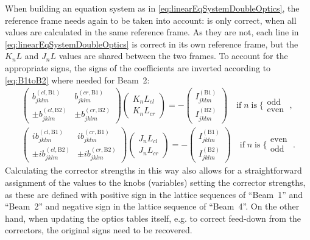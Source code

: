 When building an equation system as in \cref{eq:linearEqSystemDoubleOptics}, the reference frame needs again to be taken into account:
 is only correct, when all values are calculated in the same reference frame.  
As they are not, each line in \cref{eq:linearEqSystemDoubleOptics} is correct in its own reference frame, 
but the $K_nL$ and $J_nL$ values are shared between the two frames. 
To account for the appropriate signs, the signs of the coefficients are inverted according to \cref{eq:B1toB2} where needed for Beam~2: 
%
\begin{equation}    
    \label{eq:linearEqSystemDoubleOpticsBeamDirection}
    \begin{split}
        \begin{pmatrix}
            b_{jklm}^{(cl, \text{B1})} & b_{jklm}^{(cr, \text{B1})} \\
            \pm b_{jklm}^{(cl, \text{B2})} & \pm b_{jklm}^{(cr, \text{B2})}
        \end{pmatrix}
        \begin{pmatrix}
            K_{n}L_{cl} \\ 
            K_{n}L_{cr}
        \end{pmatrix}
        = -
        \begin{pmatrix}
            I^{(\text{B1})}_{jklm} \\ 
            I^{(\text{B2})}_{jklm} 
        \end{pmatrix} 
        \quad \text{if} \; n \; \text{is} \; \{\substack{\text{odd}\\\text{even}} \;,
        \\ 
        \begin{pmatrix}
            ib_{jklm}^{(cl, \text{B1})} & ib_{jklm}^{(cr, \text{B1})} \\
            \pm ib_{jklm}^{(cl, \text{B2})} & \pm ib_{jklm}^{(cr, \text{B2})}
        \end{pmatrix}
        \begin{pmatrix}
            J_{n}L_{cl} \\ 
            J_{n}L_{cr}
        \end{pmatrix}
        = -
        \begin{pmatrix}
            I^{(\text{B1})}_{jklm} \\ 
            I^{(\text{B2})}_{jklm} 
        \end{pmatrix} 
        \quad \text{if} \; n \; \text{is} \; \{\substack{\text{even}\\\text{odd}} \;.
    \end{split}
\end{equation}
%
Calculating the corrector strengths in this way also allows for a 
straightforward assignment of the values to the  knobs (variables) setting the corrector strengths, 
as these are defined with positive sign in the lattice sequences of ``Beam~1'' and ``Beam~2''
and negative sign in the lattice sequence of ``Beam~4''.
On the other hand, when updating the optics tables itself, e.g. to correct feed-down from the correctors, 
the original signs need to be recovered.

